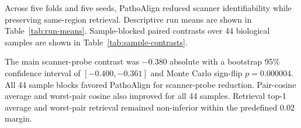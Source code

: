 \documentclass[10pt]{article}
\begin{document}
Across five folds and five seeds, PathoAlign reduced scanner identifiability while preserving same-region retrieval. Descriptive run means are shown in Table~\ref{tab:run-means}. Sample-blocked paired contrasts over 44 biological samples are shown in Table~\ref{tab:sample-contrasts}.

\begin{center}
\begin{minipage}{0.98\linewidth}
\centering
{}
\label{tab:run-means}
\footnotesize
{}
\end{minipage}
\end{center}

\begin{center}
\begin{minipage}{0.98\linewidth}
\centering
{}
\label{tab:sample-contrasts}
\footnotesize
{}
\end{minipage}
\end{center}

The main scanner-probe contrast was $-0.380$ absolute with a bootstrap 95\% confidence interval of $[-0.400, -0.361]$ and Monte Carlo sign-flip $p=0.000004$. All 44 sample blocks favored PathoAlign for scanner-probe reduction. Pair-cosine average and worst-pair cosine also improved for all 44 samples. Retrieval top-1 average and worst-pair retrieval remained non-inferior within the predefined 0.02 margin.
\end{document}
